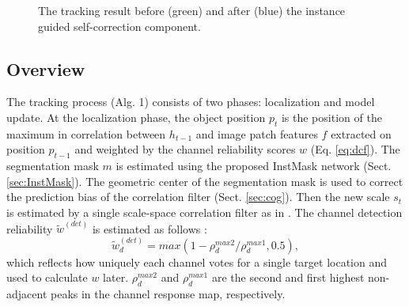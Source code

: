 \documentclass[review]{elsarticle}
\begin{document}
\begin{CJK*}{UTF8}{gbsn}
\begin{figure}
                       \hspace{-0.6em}
    \caption{The tracking result before (green) and after (blue) the instance guided self-correction component.}
    \label{fig:IGSC}
\end{figure}

\subsection{Overview}

The tracking process (Alg. 1) consists of two phases: localization and model update. 
At the localization phase,  the object position $p_t$ is the position of the maximum in correlation between $h_{t-1}$ and image patch features $f$ extracted on position $p_{t-1}$ and weighted by the channel reliability scores $w$ (Eq. \ref{eq:dcf}).
The segmentation mask $m$ is estimated using the proposed InstMask network (Sect. \ref{sec:InstMask}).
The geometric center of the segmentation mask is used to correct the prediction bias of the correlation filter (Sect. \ref{sec:cog}).
Then the new scale $s_t$ is estimated by a single scale-space correlation filter as in \cite{Danelljan2014AccurateSE}.
The channel detection reliability $\tilde{w}^{(det)}$ is estimated as follows \cite{Lukezic2017DiscriminativeCF}:
\begin{equation} \label{eq:det}
\tilde w_d^{(det)} = max(1 - \rho_d^{max2} / \rho_d^{max1}, 0.5),
\end{equation}
which reflects how uniquely each channel votes for a single target location and used to calculate $w$ later. $\rho_d^{max2}$ and $\rho_d^{max1}$ are the second and first highest non-adjacent peaks in the channel response map, respectively.


\end{CJK*}
\end{document}
